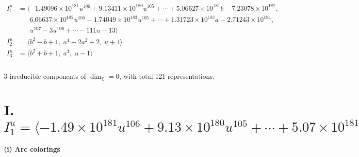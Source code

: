 \documentclass[1p]{elsarticle_modified}
\theoremstyle{definition}
\begin{document}
\begin{align*}
I^u_{1}&=\langle 
-1.49096\times10^{181} u^{106}+9.13411\times10^{180} u^{105}+\cdots+5.06627\times10^{181} b-7.23078\times10^{182},\\
\phantom{I^u_{1}}&\phantom{= \langle  }6.06637\times10^{182} u^{106}-1.74049\times10^{183} u^{105}+\cdots+1.31723\times10^{183} a-2.71243\times10^{184},\\
\phantom{I^u_{1}}&\phantom{= \langle  }u^{107}-3 u^{106}+\cdots-111 u-13\rangle \\
I^u_{2}&=\langle 
b^2- b+1,\;a^4-2 a^2+2,\;u+1\rangle \\
I^u_{3}&=\langle 
b^2+b+1,\;a^3,\;u-1\rangle \\
\\
\end{align*}
\raggedright * 3 irreducible components of $\dim_{\mathbb{C}}=0$, with total 121 representations.\\
\newpage
\renewcommand{\arraystretch}{1}
\centering \section*{I. $I^u_{1}= \langle -1.49\times10^{181} u^{106}+9.13\times10^{180} u^{105}+\cdots+5.07\times10^{181} b-7.23\times10^{182},\;6.07\times10^{182} u^{106}-1.74\times10^{183} u^{105}+\cdots+1.32\times10^{183} a-2.71\times10^{184},\;u^{107}-3 u^{106}+\cdots-111 u-13 \rangle$}
\flushleft \textbf{(i) Arc colorings}\\
\end{document}
